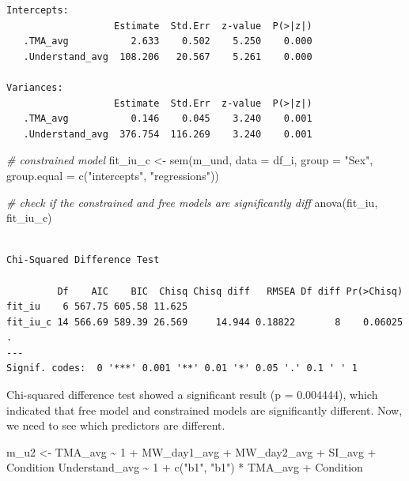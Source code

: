 \documentclass[
  letterpaper,
  DIV=11,
  numbers=noendperiod]{scrartcl}
\newenvironment{Shaded}{\begin{snugshade}}{\end{snugshade}}
\newcommand{\AttributeTok}[1]{\textcolor[rgb]{0.49,0.56,0.16}{#1}}
\newcommand{\CommentTok}[1]{\textcolor[rgb]{0.38,0.63,0.69}{\textit{#1}}}
\newcommand{\FunctionTok}[1]{\textcolor[rgb]{0.02,0.16,0.49}{#1}}
\newcommand{\NormalTok}[1]{\textcolor[rgb]{0.00,0.44,0.13}{#1}}
\newcommand{\OtherTok}[1]{\textcolor[rgb]{0.00,0.44,0.13}{#1}}
\newcommand{\StringTok}[1]{\textcolor[rgb]{0.25,0.44,0.63}{#1}}
\begin{document}
\begin{verbatim}
Intercepts:
                   Estimate  Std.Err  z-value  P(>|z|)
   .TMA_avg           2.633    0.502    5.250    0.000
   .Understand_avg  108.206   20.567    5.261    0.000

Variances:
                   Estimate  Std.Err  z-value  P(>|z|)
   .TMA_avg           0.146    0.045    3.240    0.001
   .Understand_avg  376.754  116.269    3.240    0.001
\end{verbatim}

\begin{Shaded}
\begin{Highlighting}[]
\CommentTok{\# constrained model}
\NormalTok{fit\_iu\_c }\OtherTok{\textless{}{-}} \FunctionTok{sem}\NormalTok{(m\_und, }\AttributeTok{data =}\NormalTok{ df\_i, }\AttributeTok{group =} \StringTok{"Sex"}\NormalTok{,}
                \AttributeTok{group.equal =} \FunctionTok{c}\NormalTok{(}\StringTok{"intercepts"}\NormalTok{, }\StringTok{"regressions"}\NormalTok{))}
\end{Highlighting}
\end{Shaded}

\begin{Shaded}
\begin{Highlighting}[]
\CommentTok{\# check if the constrained and free models are significantly diff}
\FunctionTok{anova}\NormalTok{(fit\_iu, fit\_iu\_c)}
\end{Highlighting}
\end{Shaded}

\begin{verbatim}

Chi-Squared Difference Test

         Df    AIC    BIC  Chisq Chisq diff   RMSEA Df diff Pr(>Chisq)  
fit_iu    6 567.75 605.58 11.625                                        
fit_iu_c 14 566.69 589.39 26.569     14.944 0.18822       8    0.06025 .
---
Signif. codes:  0 '***' 0.001 '**' 0.01 '*' 0.05 '.' 0.1 ' ' 1
\end{verbatim}

Chi-squared difference test showed a significant result (p = 0.004444),
which indicated that free model and constrained models are significantly
different. Now, we need to see which predictors are different.

\begin{Shaded}
\begin{Highlighting}[]
\NormalTok{m\_u2 }\OtherTok{\textless{}{-}} \StringTok{\textquotesingle{}}
\StringTok{  TMA\_avg \textasciitilde{} 1 + MW\_day1\_avg + MW\_day2\_avg + SI\_avg + Condition}
\StringTok{  Understand\_avg \textasciitilde{} 1 + c("b1", "b1") * TMA\_avg + Condition}
\StringTok{\textquotesingle{}}
\end{Highlighting}
\end{Shaded}
\end{document}
